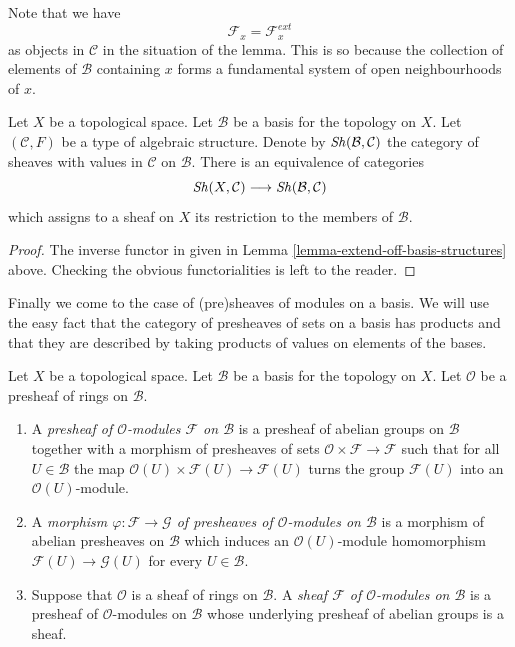 \noindent
Note that we have
$$
\mathcal{F}_x = \mathcal{F}_x^{ext}
$$
as objects in $\mathcal{C}$
in the situation of the lemma. This is so because the
collection of elements of $\mathcal{B}$ containing
$x$ forms a fundamental system of open neighbourhoods of $x$.

\begin{lemma}
\label{lemma-restrict-basis-equivalence-structures}
Let $X$ be a topological space.
Let $\mathcal{B}$ be a basis for the topology on $X$.
Let $(\mathcal{C}, F)$ be a type of algebraic structure.
Denote by $\mathop{\mathit{Sh}}\nolimits(\mathcal{B}, \mathcal{C})$ the category of
sheaves with values in $\mathcal{C}$ on $\mathcal{B}$.
There is an equivalence of categories
$$
\mathop{\mathit{Sh}}\nolimits(X, \mathcal{C})
\longrightarrow
\mathop{\mathit{Sh}}\nolimits(\mathcal{B}, \mathcal{C})
$$
which assigns to a sheaf on $X$ its restriction to
the members of $\mathcal{B}$.
\end{lemma}

\begin{proof}
The inverse functor in given in
Lemma \ref{lemma-extend-off-basis-structures} above.
Checking the obvious functorialities is left to the
reader.
\end{proof}

\noindent
Finally we come to the case of (pre)sheaves of modules
on a basis. We will use the easy fact that the category
of presheaves of sets on a basis has products and that
they are described by taking products of values on
elements of the bases.

\begin{definition}
\label{definition-sheaf-modules-basis}
Let $X$ be a topological space. Let $\mathcal{B}$ be a
basis for the topology on $X$. Let $\mathcal{O}$ be
a presheaf of rings on $\mathcal{B}$.
\begin{enumerate}
\item A {\it presheaf of $\mathcal{O}$-modules $\mathcal{F}$
on $\mathcal{B}$} is a presheaf of abelian groups on
$\mathcal{B}$ together with a morphism of presheaves
of sets $\mathcal{O} \times \mathcal{F} \to \mathcal{F}$
such that for all $U \in \mathcal{B}$ the map
$\mathcal{O}(U) \times \mathcal{F}(U) \to \mathcal{F}(U)$
turns the group $\mathcal{F}(U)$ into an $\mathcal{O}(U)$-module.
\item A {\it morphism $\varphi : \mathcal{F} \to \mathcal{G}$
of presheaves of $\mathcal{O}$-modules on $\mathcal{B}$}
is a morphism of abelian presheaves on $\mathcal{B}$
which induces an $\mathcal{O}(U)$-module homomorphism
$\mathcal{F}(U) \to \mathcal{G}(U)$ for every $U \in \mathcal{B}$.
\item Suppose that $\mathcal{O}$ is a sheaf of rings
on $\mathcal{B}$. A {\it sheaf $\mathcal{F}$ of $\mathcal{O}$-modules
on $\mathcal{B}$} is a presheaf of $\mathcal{O}$-modules
on $\mathcal{B}$ whose underlying presheaf of abelian groups
is a sheaf.
\end{enumerate}
\end{definition}

